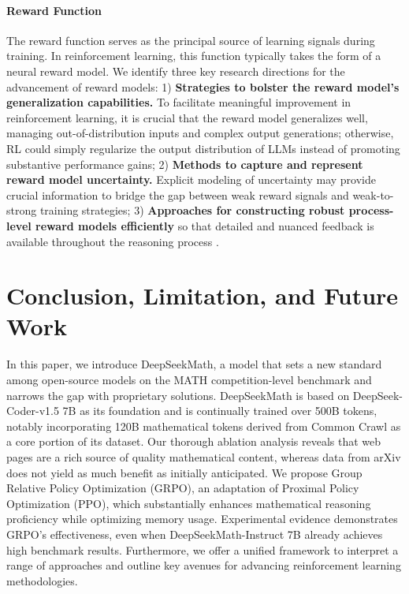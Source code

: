 \begin{itemize}[topsep=0pt]
\begin{itemize}[topsep=0pt]
\paragraph{Reward Function} The reward function serves as the principal source of learning signals during training. In reinforcement learning, this function typically takes the form of a neural reward model. We identify three key research directions for the advancement of reward models: 1) \textbf{Strategies to bolster the reward model’s generalization capabilities.} To facilitate meaningful improvement in reinforcement learning, it is crucial that the reward model generalizes well, managing out-of-distribution inputs and complex output generations; otherwise, RL could simply regularize the output distribution of LLMs instead of promoting substantive performance gains; 2) \textbf{Methods to capture and represent reward model uncertainty.} Explicit modeling of uncertainty may provide crucial information to bridge the gap between weak reward signals and weak-to-strong training strategies; 3) \textbf{Approaches for constructing robust process-level reward models efficiently} so that detailed and nuanced feedback is available throughout the reasoning process \citep{lightman2023let,wang2023math}.

\section{Conclusion, Limitation, and Future Work}

In this paper, we introduce DeepSeekMath, a model that sets a new standard among open-source models on the MATH competition-level benchmark and narrows the gap with proprietary solutions. DeepSeekMath is based on DeepSeek-Coder-v1.5 7B as its foundation and is continually trained over 500B tokens, notably incorporating 120B mathematical tokens derived from Common Crawl as a core portion of its dataset. Our thorough ablation analysis reveals that web pages are a rich source of quality mathematical content, whereas data from arXiv does not yield as much benefit as initially anticipated. We propose Group Relative Policy Optimization (GRPO), an adaptation of Proximal Policy Optimization (PPO), which substantially enhances mathematical reasoning proficiency while optimizing memory usage. Experimental evidence demonstrates GRPO’s effectiveness, even when DeepSeekMath-Instruct 7B already achieves high benchmark results. Furthermore, we offer a unified framework to interpret a range of approaches and outline key avenues for advancing reinforcement learning methodologies.


\end{itemize}
\end{itemize}
